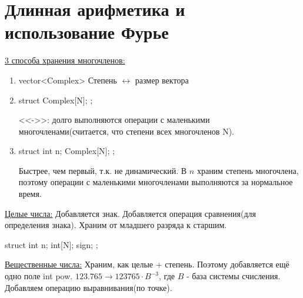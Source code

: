 \section{Длинная арифметика и использование Фурье}

\underline{3 способа хранения многочленов:}
\begin{enumerate}
	\item vector<Complex> Степень $\leftrightarrow$ размер вектора
	\item 
		\begin{cppcode}
struct{
	Complex[N];
};
		\end{cppcode}
		<<->>: долго выполняются операции с маленькими многочленами(считается, что степени всех многочленов N).
	\item 
		\begin{cppcode}
struct{
	int n;
	Complex[N];
};
		\end{cppcode}
		Быстрее, чем первый, т.к. не динамический. В $n$ храним степень многочлена, поэтому операции с маленькими 
		многочленами выполняются за нормальное время. 
\end{enumerate}

\underline{Целые числа:}
	Добавляется знак. Добавляется операция сравнения(для определения знака). Храним от младшего разряда к старшим.
	\begin{cppcode}
struct{
	int n;
	int[N];
	sign;
};
	\end{cppcode}

\underline{Вещественные числа:}
	Храним, как целые + степень. Поэтому добавляется ещё одно поле int pow. 
	$123.765 \rightarrow 123765 \cdot B^{-3}$, где $B$ - база системы счисления.
	Добавляем операцию выравнивания(по точке). \\


